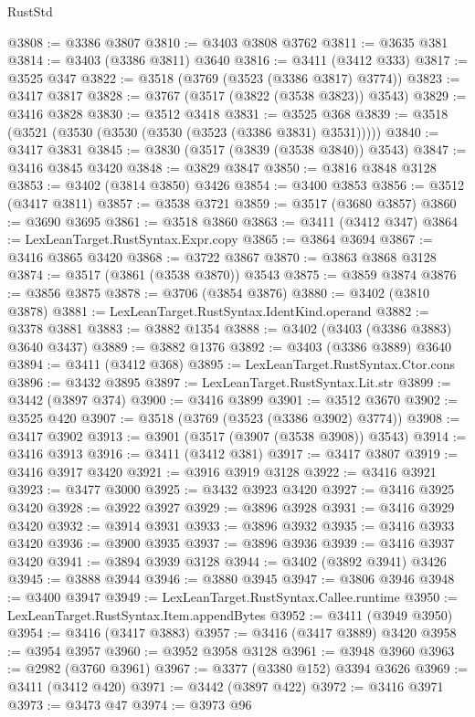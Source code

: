 \begin{lexlean}{RustStd}
\begin{coremodule}
@3808 := @3386 @3807
@3810 := @3403 @3808 @3762
@3811 := @3635 @381
@3814 := @3403 (@3386 @3811) @3640
@3816 := @3411 (@3412 @333)
@3817 := @3525 @347
@3822 := @3518 (@3769 (@3523 (@3386 @3817) @3774))
@3823 := @3417 @3817
@3828 := @3767 (@3517 (@3822 (@3538 @3823)) @3543)
@3829 := @3416 @3828
@3830 := @3512 @3418
@3831 := @3525 @368
@3839 := @3518 (@3521 (@3530 (@3530 (@3530 (@3523 (@3386 @3831) @3531)))))
@3840 := @3417 @3831
@3845 := @3830 (@3517 (@3839 (@3538 @3840)) @3543)
@3847 := @3416 @3845 @3420
@3848 := @3829 @3847
@3850 := @3816 @3848 @3128
@3853 := @3402 (@3814 @3850) @3426
@3854 := @3400 @3853
@3856 := @3512 (@3417 @3811)
@3857 := @3538 @3721
@3859 := @3517 (@3680 @3857)
@3860 := @3690 @3695
@3861 := @3518 @3860
@3863 := @3411 (@3412 @347)
@3864 := LexLeanTarget.RustSyntax.Expr.copy
@3865 := @3864 @3694
@3867 := @3416 @3865 @3420
@3868 := @3722 @3867
@3870 := @3863 @3868 @3128
@3874 := @3517 (@3861 (@3538 @3870)) @3543
@3875 := @3859 @3874
@3876 := @3856 @3875
@3878 := @3706 (@3854 @3876)
@3880 := @3402 (@3810 @3878)
@3881 := LexLeanTarget.RustSyntax.IdentKind.operand
@3882 := @3378 @3881
@3883 := @3882 @1354
@3888 := @3402 (@3403 (@3386 @3883) @3640 @3437)
@3889 := @3882 @1376
@3892 := @3403 (@3386 @3889) @3640
@3894 := @3411 (@3412 @368)
@3895 := LexLeanTarget.RustSyntax.Ctor.cons
@3896 := @3432 @3895
@3897 := LexLeanTarget.RustSyntax.Lit.str
@3899 := @3442 (@3897 @374)
@3900 := @3416 @3899
@3901 := @3512 @3670
@3902 := @3525 @420
@3907 := @3518 (@3769 (@3523 (@3386 @3902) @3774))
@3908 := @3417 @3902
@3913 := @3901 (@3517 (@3907 (@3538 @3908)) @3543)
@3914 := @3416 @3913
@3916 := @3411 (@3412 @381)
@3917 := @3417 @3807
@3919 := @3416 @3917 @3420
@3921 := @3916 @3919 @3128
@3922 := @3416 @3921
@3923 := @3477 @3000
@3925 := @3432 @3923 @3420
@3927 := @3416 @3925 @3420
@3928 := @3922 @3927
@3929 := @3896 @3928
@3931 := @3416 @3929 @3420
@3932 := @3914 @3931
@3933 := @3896 @3932
@3935 := @3416 @3933 @3420
@3936 := @3900 @3935
@3937 := @3896 @3936
@3939 := @3416 @3937 @3420
@3941 := @3894 @3939 @3128
@3944 := @3402 (@3892 @3941) @3426
@3945 := @3888 @3944
@3946 := @3880 @3945
@3947 := @3806 @3946
@3948 := @3400 @3947
@3949 := LexLeanTarget.RustSyntax.Callee.runtime
@3950 := LexLeanTarget.RustSyntax.Item.appendBytes
@3952 := @3411 (@3949 @3950)
@3954 := @3416 (@3417 @3883)
@3957 := @3416 (@3417 @3889) @3420
@3958 := @3954 @3957
@3960 := @3952 @3958 @3128
@3961 := @3948 @3960
@3963 := @2982 (@3760 @3961)
@3967 := @3377 (@3380 @152) @3394 @3626
@3969 := @3411 (@3412 @420)
@3971 := @3442 (@3897 @422)
@3972 := @3416 @3971
@3973 := @3473 @47
@3974 := @3973 @96

\end{coremodule}
\end{lexlean}
